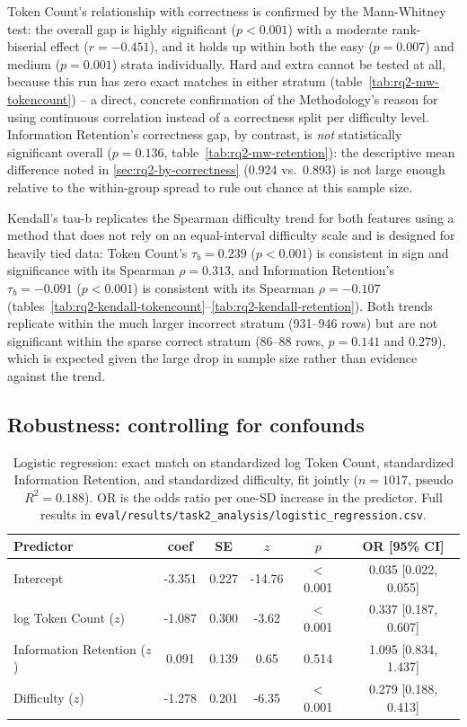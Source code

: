 Token Count's relationship with correctness is confirmed by the Mann-Whitney test: the overall gap is highly significant ($p<0.001$) with a moderate rank-biserial effect ($r=-0.451$), and it holds up within both the easy ($p=0.007$) and medium ($p=0.001$) strata individually. Hard and extra cannot be tested at all, because this run has zero exact matches in either stratum (table~\ref{tab:rq2-mw-tokencount}) -- a direct, concrete confirmation of the Methodology's reason for using continuous correlation instead of a correctness split per difficulty level. Information Retention's correctness gap, by contrast, is \emph{not} statistically significant overall ($p=0.136$, table~\ref{tab:rq2-mw-retention}): the descriptive mean difference noted in \ref{sec:rq2-by-correctness} (0.924 vs.\ 0.893) is not large enough relative to the within-group spread to rule out chance at this sample size.

Kendall's tau-b replicates the Spearman difficulty trend for both features using a method that does not rely on an equal-interval difficulty scale and is designed for heavily tied data: Token Count's $\tau_b=0.239$ ($p<0.001$) is consistent in sign and significance with its Spearman $\rho=0.313$, and Information Retention's $\tau_b=-0.091$ ($p<0.001$) is consistent with its Spearman $\rho=-0.107$ (tables~\ref{tab:rq2-kendall-tokencount}--\ref{tab:rq2-kendall-retention}). Both trends replicate within the much larger incorrect stratum (931--946 rows) but are not significant within the sparse correct stratum (86--88 rows, $p=0.141$ and $0.279$), which is expected given the large drop in sample size rather than evidence against the trend.

\subsection{Robustness: controlling for confounds}
\label{sec:rq2-robustness}

\begin{table}[H]
\centering
\footnotesize
\caption{Logistic regression: exact match on standardized log Token Count, standardized Information Retention, and standardized difficulty, fit jointly ($n=1017$, pseudo $R^2=0.188$). OR is the odds ratio per one-SD increase in the predictor. Full results in \texttt{eval/results/task2\_analysis/logistic\_regression.csv}.}
\label{tab:rq2-logistic}
\begin{tabular}{lccccc}
\toprule
Predictor & coef & SE & $z$ & $p$ & OR [95\% CI] \\
\midrule
Intercept & -3.351 & 0.227 & -14.76 & $<$0.001 & 0.035 [0.022, 0.055] \\
log Token Count ($z$) & -1.087 & 0.300 & -3.62 & $<$0.001 & 0.337 [0.187, 0.607] \\
Information Retention ($z$) & 0.091 & 0.139 & 0.65 & 0.514 & 1.095 [0.834, 1.437] \\
Difficulty ($z$) & -1.278 & 0.201 & -6.35 & $<$0.001 & 0.279 [0.188, 0.413] \\
\bottomrule
\end{tabular}
\end{table}

